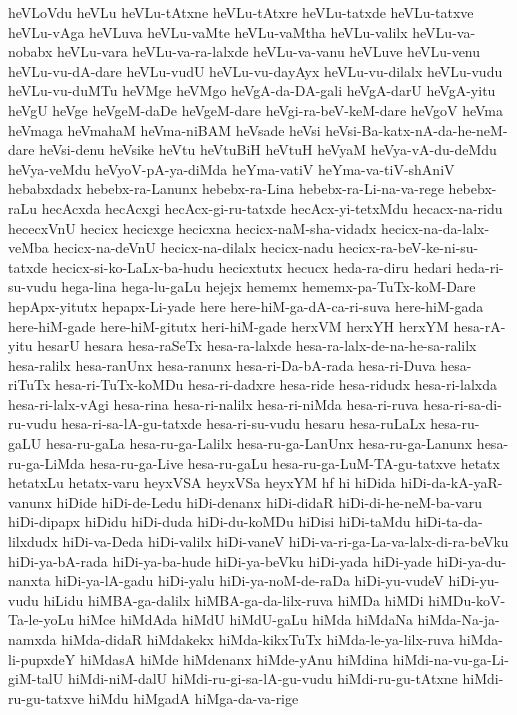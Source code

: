 {heVLoVdu
heVLu
heVLu-tAtxne
heVLu-tAtxre
heVLu-tatxde
heVLu-tatxve
heVLu-vAga
heVLuva
heVLu-vaMte
heVLu-vaMtha
heVLu-valilx
heVLu-va-nobabx
heVLu-vara
heVLu-va-ra-lalxde
heVLu-va-vanu
heVLuve
heVLu-venu
heVLu-vu-dA-dare
heVLu-vudU
heVLu-vu-dayAyx
heVLu-vu-dilalx
heVLu-vudu
heVLu-vu-duMTu
heVMge
heVMgo
heVgA-da-DA-gali
heVgA-darU
heVgA-yitu
heVgU
heVge
heVgeM-daDe
heVgeM-dare
heVgi-ra-beV-keM-dare
heVgoV
heVma
heVmaga
heVmahaM
heVma-niBAM
heVsade
heVsi
heVsi-Ba-katx-nA-da-he-neM-dare
heVsi-denu
heVsike
heVtu
heVtuBiH
heVtuH
heVyaM
heVya-vA-du-deMdu
heVya-veMdu
heVyoV-pA-ya-diMda
heYma-vatiV
heYma-va-tiV-shAniV
hebabxdadx
hebebx-ra-Lanunx
hebebx-ra-Lina
hebebx-ra-Li-na-va-rege
hebebx-raLu
hecAcxda
hecAcxgi
hecAcx-gi-ru-tatxde
hecAcx-yi-tetxMdu
hecacx-na-ridu
hececxVnU
hecicx
hecicxge
hecicxna
hecicx-naM-sha-vidadx
hecicx-na-da-lalx-veMba
hecicx-na-deVnU
hecicx-na-dilalx
hecicx-nadu
hecicx-ra-beV-ke-ni-su-tatxde
hecicx-si-ko-LaLx-ba-hudu
hecicxtutx
hecucx
heda-ra-diru
hedari
heda-ri-su-vudu
hega-lina
hega-lu-gaLu
hejejx
hememx
hememx-pa-TuTx-koM-Dare
hepApx-yitutx
hepapx-Li-yade
here
here-hiM-ga-dA-ca-ri-suva
here-hiM-gada
here-hiM-gade
here-hiM-gitutx
heri-hiM-gade
herxVM
herxYH
herxYM
hesa-rA-yitu
hesarU
hesara
hesa-raSeTx
hesa-ra-lalxde
hesa-ra-lalx-de-na-he-sa-ralilx
hesa-ralilx
hesa-ranUnx
hesa-ranunx
hesa-ri-Da-bA-rada
hesa-ri-Duva
hesa-riTuTx
hesa-ri-TuTx-koMDu
hesa-ri-dadxre
hesa-ride
hesa-ridudx
hesa-ri-lalxda
hesa-ri-lalx-vAgi
hesa-rina
hesa-ri-nalilx
hesa-ri-niMda
hesa-ri-ruva
hesa-ri-sa-di-ru-vudu
hesa-ri-sa-lA-gu-tatxde
hesa-ri-su-vudu
hesaru
hesa-ruLaLx
hesa-ru-gaLU
hesa-ru-gaLa
hesa-ru-ga-Lalilx
hesa-ru-ga-LanUnx
hesa-ru-ga-Lanunx
hesa-ru-ga-LiMda
hesa-ru-ga-Live
hesa-ru-gaLu
hesa-ru-ga-LuM-TA-gu-tatxve
hetatx
hetatxLu
hetatx-varu
heyxVSA
heyxVSa
heyxYM
hf
hi
hiDida
hiDi-da-kA-yaR-vanunx
hiDide
hiDi-de-Ledu
hiDi-denanx
hiDi-didaR
hiDi-di-he-neM-ba-varu
hiDi-dipapx
hiDidu
hiDi-duda
hiDi-du-koMDu
hiDisi
hiDi-taMdu
hiDi-ta-da-lilxdudx
hiDi-va-Deda
hiDi-valilx
hiDi-vaneV
hiDi-va-ri-ga-La-va-lalx-di-ra-beVku
hiDi-ya-bA-rada
hiDi-ya-ba-hude
hiDi-ya-beVku
hiDi-yada
hiDi-yade
hiDi-ya-du-nanxta
hiDi-ya-lA-gadu
hiDi-yalu
hiDi-ya-noM-de-raDa
hiDi-yu-vudeV
hiDi-yu-vudu
hiLidu
hiMBA-ga-dalilx
hiMBA-ga-da-lilx-ruva
hiMDa
hiMDi
hiMDu-koV-Ta-le-yoLu
hiMce
hiMdAda
hiMdU
hiMdU-gaLu
hiMda
hiMdaNa
hiMda-Na-ja-namxda
hiMda-didaR
hiMdakekx
hiMda-kikxTuTx
hiMda-le-ya-lilx-ruva
hiMda-li-pupxdeY
hiMdasA
hiMde
hiMdenanx
hiMde-yAnu
hiMdina
hiMdi-na-vu-ga-Li-giM-talU
hiMdi-niM-dalU
hiMdi-ru-gi-sa-lA-gu-vudu
hiMdi-ru-gu-tAtxne
hiMdi-ru-gu-tatxve
hiMdu
hiMgadA
hiMga-da-va-rige
}
